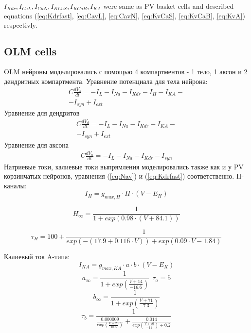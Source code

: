 \documentclass[a4paper,12pt]{article}
\begin{document}
$ I_{Kdr}, I_{CaL}, I_{CaN},I_{KCaS}, I_{KCaB}, I_{KA}$ were same as PV basket cells and described equations (\ref{eq:Kdrfast}, \ref{eq:CavL}, \ref{eq:CavN}, \ref{eq:KvCaS}, \ref{eq:KvCaB}, \ref{eq:KvA}) respectivly.

\subsection{OLM cells}
OLM нейроны моделировались с помощью 4 компартментов - 1 тело, 1 аксон и 2 дендритных компартмента. Уравнение потенциала для тела нейрона:
\begin{eqnarray}
C\frac{dV_s}{dt} = -I_L - I_{Na} - I_{Kdr} - I_{H} - I_{KA}-
 \nonumber \\
-I_{syn} + I_{ext}
\end{eqnarray}
Уравнение для дендритов
\begin{eqnarray}
C\frac{dV_d}{dt} = -I_L - I_{Na} - I_{Kdr} - I_{KA}-
\nonumber \\
-I_{syn} + I_{ext}
\end{eqnarray}
Уравнение для аксона
\begin{eqnarray}
C\frac{dV_a}{dt} = -I_L - I_{Na} - I_{Kdr} - I_{syn}
\end{eqnarray}
Натриевые токи, калиевые токи выпрямления моделировались также как и у PV корзинчатых нейронов, уравнения (\ref{eq:Nav}) и (\ref{eq:Kdrfast}) соответственно.
H-каналы:
\begin{equation}
\label{eq:HCNolm}
I_{H} = g_{max, H} \cdot H \cdot (V - E_{H})
\end{equation}

\begin{equation}
H_{\infty} =  \frac{1}{1 + exp(0.98 \cdot(V + 84.1))}
\end{equation}

\begin{equation}
\tau_{H} = 100 + \frac{1}{exp(-(17.9+0.116\cdot V)) + exp(0.09 \cdot V-1.84)   }
\end{equation}

Калиевый ток A-типа:
\begin{equation}
\label{eq:KvAolm}
I_{KA} = g_{max, KA} \cdot a \cdot b \cdot (V - E_K)
\end{equation}
\begin{equation}
a_{\infty} = \frac{1}{1 + exp(\frac{V + 14}{-16.6})  } \ \ \tau_a = 5
\end{equation}
\begin{equation}
b_{\infty} = \frac{1}{1 + exp(\frac{V + 71}{7.3})  }
\end{equation}
\begin{equation}
\tau_b = \frac{1}{\frac{0.000009}{exp(\frac{V - 26}{18.5})}  + \frac{0.014}{exp(\frac{V +70}{-11}) + 0.2} }
\end{equation}
\end{document}

